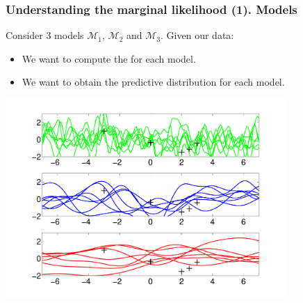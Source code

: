 \begin{frame}
\frametitle{Understanding the marginal likelihood (1). Models}

Consider 3 models $\mathcal{M}_1$,  $\mathcal{M}_2$ and  $\mathcal{M}_3$. Given our data:
\begin{itemize}
\item We want to compute the  for each model.
\item We want to obtain the predictive distribution for each model.
\end{itemize}
\vspace{-0.5cm}
\parbox{\textwidth}{
\centerline{\includegraphics[width=0.8\textwidth]{rejection_sampling_data_priors.pdf}}
}

\end{frame}


